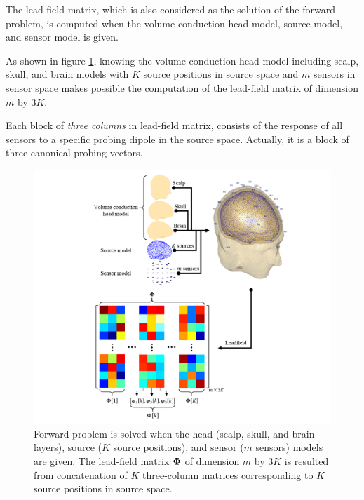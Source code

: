 The lead-field matrix, which is also considered as the solution of the forward problem, is computed when the volume conduction head model, source model, and sensor model is given.

As shown in figure \ref{fig:LF}, knowing the volume conduction head model including scalp, skull, and brain models with $K$ source positions in source space and $m$ sensors in sensor space makes possible the computation of the lead-field matrix of dimension $m$ by $3K$.

Each block of \emph{three columns} in lead-field matrix, consists of the response of all sensors to a specific probing dipole in the source space.
Actually, it is a block of three canonical probing vectors.
\begin{figure}[!b]
\centering
\includegraphics[width=1\textwidth]{images/LF.png} %
\caption{Forward problem is solved when the head (scalp, skull, and brain layers), source ($K$ source positions), and sensor ($m$ sensors) models are given.
The lead-field matrix $\boldsymbol{\Phi}$ of dimension $m$ by $3K$ is resulted from concatenation of $K$ three-column matrices corresponding to $K$ source positions in source space.
}
\label{fig:LF}
\end{figure}
\FloatBarrier
